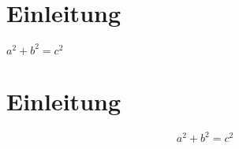\documentclass[12pt,ngerman]{scrartcl}
\begin{document}
\section{Einleitung}



\begin{theorem} 

\(a^2+b^2=c^2\)

\end{theorem}

\section{Einleitung}



\begin{theorem} 
\blindtext

\[a^2+b^2=c^2\]

\end{theorem}
\end{document}
